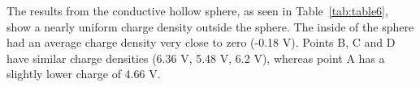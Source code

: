     The results from the conductive hollow sphere, as seen in Table~\ref{tab:table6}, show a nearly uniform charge density outside the sphere. The inside of the sphere had an average charge density very close to zero (-0.18 V). Points B, C and D have similar charge densities (6.36 V, 5.48 V, 6.2 V), whereas point A has a slightly lower charge of 4.66 V.
    
    \newpage


\newpage